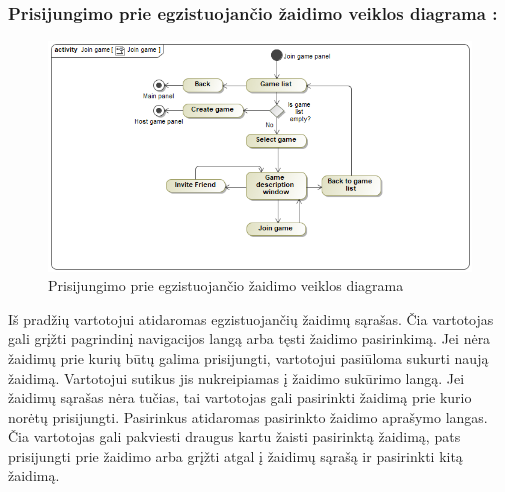 \documentclass{VUMIFPSkursinis}
\begin{document}
		\subsubsection*{Prisijungimo prie egzistuojančio žaidimo veiklos diagrama :}
			\begin{figure}[H]
				\centering
				\includegraphics[scale=0.5]{img/JoinGame_activity}
				\caption{Prisijungimo prie egzistuojančio žaidimo veiklos diagrama}
				\label{img:JoinGame_activity}
			\end{figure}
			Iš pradžių vartotojui atidaromas egzistuojančių žaidimų sąrašas. Čia 
			vartotojas gali grįžti pagrindinį navigacijos langą arba tęsti žaidimo
			pasirinkimą. Jei nėra žaidimų prie kurių būtų galima prisijungti, vartotojui
			pasiūloma sukurti naują žaidimą. Vartotojui sutikus jis nukreipiamas į 
			žaidimo sukūrimo langą. Jei žaidimų sąrašas nėra tučias, tai vartotojas
			gali pasirinkti žaidimą prie kurio norėtų prisijungti. Pasirinkus atidaromas
			pasirinkto žaidimo aprašymo langas. Čia vartotojas gali pakviesti draugus
			kartu žaisti pasirinktą žaidimą, pats prisijungti prie žaidimo arba grįžti
			atgal į žaidimų sąrašą ir pasirinkti kitą žaidimą.
\end{document}
